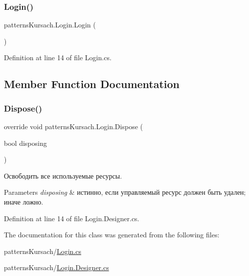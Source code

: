 \subsubsection{\texorpdfstring{Login()}{Login()}}
{\footnotesize\ttfamily patterns\+Kursach.\+Login.\+Login (\begin{DoxyParamCaption}{ }\end{DoxyParamCaption})}



Definition at line 14 of file Login.\+cs.



\subsection{Member Function Documentation}
\mbox{\label{classpatterns_kursach_1_1_login_ad03dba5cc72d1a588166064d049911db}} 
\subsubsection{\texorpdfstring{Dispose()}{Dispose()}}
{\footnotesize\ttfamily override void patterns\+Kursach.\+Login.\+Dispose (\begin{DoxyParamCaption}\item[{bool}]{disposing }\end{DoxyParamCaption})\hspace{0.3cm}{\ttfamily [protected]}}



Освободить все используемые ресурсы. 


\begin{DoxyParams}{Parameters}
{\em disposing} & истинно, если управляемый ресурс должен быть удален; иначе ложно.\\
\hline
\end{DoxyParams}


Definition at line 14 of file Login.\+Designer.\+cs.



The documentation for this class was generated from the following files\+:\begin{DoxyCompactItemize}
\item 
patterns\+Kursach/\mbox{\hyperlink{_login_8cs}{Login.\+cs}}\item 
patterns\+Kursach/\mbox{\hyperlink{_login_8_designer_8cs}{Login.\+Designer.\+cs}}\end{DoxyCompactItemize}
